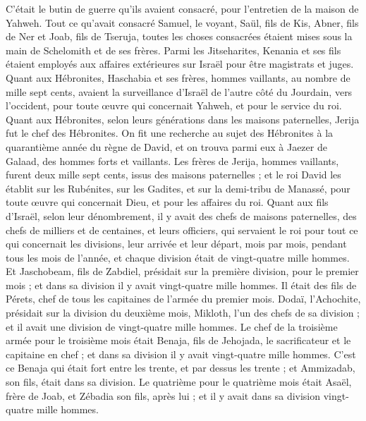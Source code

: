 \begin{multicols}{2}
C'était le butin de guerre qu'ils avaient consacré, pour l’entretien de la maison de Yahweh.
Tout ce qu'avait consacré Samuel, le voyant, Saül, fils de Kis, Abner, fils de Ner et Joab, fils de Tseruja, toutes les choses consacrées étaient mises sous la main de Schelomith et de ses frères.
Parmi les Jitseharites, Kenania et ses fils étaient employés aux affaires extérieures sur Israël pour être magistrats et juges.
Quant aux Hébronites, Haschabia et ses frères, hommes vaillants, au nombre de mille sept cents, avaient la surveillance d'Israël de l’autre côté du Jourdain, vers l'occident, pour toute œuvre qui concernait Yahweh, et pour le service du roi.
Quant aux Hébronites, selon leurs générations dans les maisons paternelles, Jerija fut le chef des Hébronites. On fit une recherche au sujet des Hébronites à la quarantième année du règne de David, et on trouva parmi eux à Jaezer de Galaad, des hommes forts et vaillants.
Les frères de Jerija, hommes vaillants, furent deux mille sept cents, issus des maisons paternelles ; et le roi David les établit sur les Rubénites, sur les Gadites, et sur la demi-tribu de Manassé, pour toute œuvre qui concernait Dieu, et pour les affaires du roi.
\VerseOne{}Quant aux fils d'Israël, selon leur dénombrement, il y avait des chefs de maisons paternelles, des chefs de milliers et de centaines, et leurs officiers, qui servaient le roi pour tout ce qui concernait les divisions, leur arrivée et leur départ, mois par mois, pendant tous les mois de l'année, et chaque division était de vingt-quatre mille hommes.
Et Jaschobeam, fils de Zabdiel, présidait sur la première division, pour le premier mois ; et dans sa division il y avait vingt-quatre mille hommes.
Il était des fils de Pérets, chef de tous les capitaines de l'armée du premier mois.
Dodaï, l'Achochite, présidait sur la division du deuxième mois, Mikloth, l’un des chefs de sa division ; et il avait une division de vingt-quatre mille hommes.
Le chef de la troisième armée pour le troisième mois était Benaja, fils de Jehojada, le sacrificateur et le capitaine en chef ; et dans sa division il y avait vingt-quatre mille hommes.
C'est ce Benaja qui était fort entre les trente, et par dessus les trente ; et Ammizadab, son fils, était dans sa division.
Le quatrième pour le quatrième mois était Asaël, frère de Joab, et Zébadia son fils, après lui ; et il y avait dans sa division vingt-quatre mille hommes.

\end{multicols}
